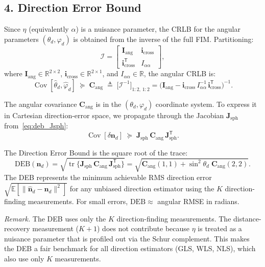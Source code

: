 \documentclass[journal]{IEEEtran}
\begin{document}
\subsection*{4. Direction Error Bound}

Since $\eta$ (equivalently $\alpha$) is a nuisance parameter, the CRLB 
for the angular parameters $(\theta_d,\varphi_d)$ is obtained from the 
inverse of the full FIM.  Partitioning:
\begin{equation}
  \mathcal{I} = 
  \begin{bmatrix}
    \mathbf{I}_{\mathrm{ang}} & \mathbf{i}_{\mathrm{cross}} \\
    \mathbf{i}_{\mathrm{cross}}^{\mathsf{T}} & I_{\alpha\alpha}
  \end{bmatrix},
\end{equation}
where $\mathbf{I}_{\mathrm{ang}} \in \mathbb{R}^{2\times2}$, 
$\mathbf{i}_{\mathrm{cross}} \in \mathbb{R}^{2\times1}$, and 
$I_{\alpha\alpha} \in \mathbb{R}$, the angular CRLB is:
\begin{equation}
  \operatorname{Cov}[\hat\theta_d,\hat\varphi_d]
  \;\succeq\;
  \mathbf{C}_{\mathrm{ang}}
  \;\triangleq\;
  \bigl[\mathcal{I}^{-1}\bigr]_{1:2,\,1:2}
  = \bigl(\mathbf{I}_{\mathrm{ang}} 
    - \mathbf{i}_{\mathrm{cross}}\,I_{\alpha\alpha}^{-1}\,
      \mathbf{i}_{\mathrm{cross}}^{\mathsf{T}}\bigr)^{-1}.
  \label{eq:deb_Cang}
\end{equation}

The angular covariance $\mathbf{C}_{\mathrm{ang}}$ is in the 
$(\theta_d,\varphi_d)$ coordinate system.  To express it in Cartesian 
direction-error space, we propagate through the Jacobian 
$\mathbf{J}_{\mathrm{sph}}$ from~\eqref{eq:deb_Jsph}:
\begin{equation}
  \operatorname{Cov}[\delta\mathbf{n}_d]
  \;\succeq\;
  \mathbf{J}_{\mathrm{sph}}\,\mathbf{C}_{\mathrm{ang}}\,
  \mathbf{J}_{\mathrm{sph}}^{\mathsf{T}}.
\end{equation}

The Direction Error Bound is the square root of the trace:
\begin{equation}
  \boxed{
  \mathrm{DEB}(\mathbf{n}_d)
  = \sqrt{\operatorname{tr}\!\bigl\{
    \mathbf{J}_{\mathrm{sph}}\,\mathbf{C}_{\mathrm{ang}}\,
    \mathbf{J}_{\mathrm{sph}}^{\mathsf{T}}
    \bigr\}}
  = \sqrt{
    \mathbf{C}_{\mathrm{ang}}(1,1) 
    + \sin^2\!\theta_d\;\mathbf{C}_{\mathrm{ang}}(2,2)
    }.
  }
  \label{eq:DEB}
\end{equation}
The DEB represents the minimum achievable RMS direction error 
$\sqrt{\mathbb{E}[\|\hat{\mathbf{n}}_d - \mathbf{n}_d\|^2]}$
for any unbiased direction estimator using the $K$ direction-finding 
measurements.  For small errors, $\mathrm{DEB} \approx$ angular RMSE 
in radians.

\emph{Remark.}
The DEB uses only the $K$ direction-finding measurements.  
The distance-recovery measurement ($K{+}1$) does not contribute because 
$\eta$ is treated as a nuisance parameter that is profiled out via the 
Schur complement.  This makes the DEB a fair benchmark for all 
direction estimators (GLS, WLS, NLS), which also use only $K$ measurements.



\end{document}
